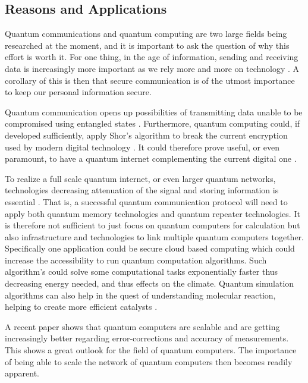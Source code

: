 \subsection{Reasons and Applications}
Quantum communications and quantum computing are two large fields being researched at the moment, and it is important to ask the question of why this effort is worth it. For one thing, in the age of information, sending and receiving data is increasingly more important as we rely more and more on technology \cite{Azuma:2023}. A corollary of this is then that secure communication is of the utmost importance to keep our personal information secure. \cite{Hu:2023}

Quantum communication opens up possibilities of transmitting data unable to be compromised using entangled states \cite{Hu:2023}. Furthermore, quantum computing could, if developed sufficiently, apply Shor's algorithm to break the current encryption used by modern digital technology \cite{Nielsen:2010}. It could therefore prove useful, or even paramount, to have a quantum internet complementing the current digital one \cite{Azuma:2023}.

To realize a full scale quantum internet, or even larger quantum networks, technologies decreasing attenuation of the signal and storing information is essential \cite{Azuma:2023}. That is, a successful quantum communication protocol will need to apply both quantum memory technologies and quantum repeater technologies. It is therefore not sufficient to just focus on quantum computers for calculation but also infrastructure and technologies to link multiple quantum computers together. Specifically one application could be secure cloud based computing \cite{Azuma:2023} which could increase the accessibility to run quantum computation algorithms. Such algorithm's could solve some computational tasks exponentially faster thus decreasing energy needed, and thus effects on the climate. Quantum simulation algorithms can also help in the quest of understanding molecular reaction, helping to create more efficient catalysts \cite{Outeiral:2021}.

A recent paper \cite{Acharya:2024} shows that quantum computers are scalable and are getting increasingly better regarding error-corrections and accuracy of measurements. This shows a great outlook for the field of quantum computers. The importance of being able to scale the network of quantum computers then becomes readily apparent.